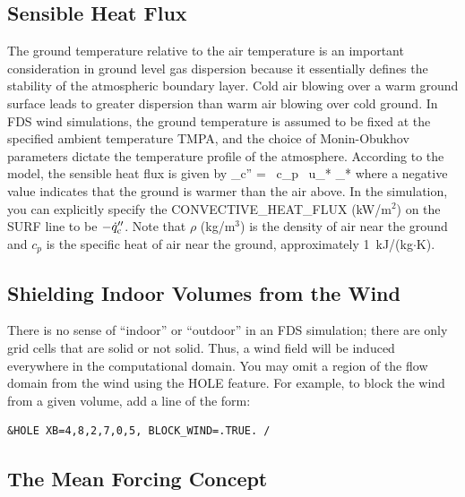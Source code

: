 \documentclass[11pt]{book}
\begin{document}
\subsection{Sensible Heat Flux}

The ground temperature relative to the air temperature is an important consideration in ground level gas dispersion because it essentially defines the stability of the atmospheric boundary layer. Cold air blowing over a warm ground surface leads to greater dispersion than warm air blowing over cold ground. In FDS wind simulations, the ground temperature is assumed to be fixed at the specified ambient temperature {\ct TMPA}, and the choice of Monin-Obukhov parameters dictate the temperature profile of the atmosphere.  According to the model, the sensible heat flux is given by
\be
   _{\rm c}'' = \rho \, c_p \, u_* \theta_*
\ee
where a negative value indicates that the ground is warmer than the air above. In the simulation, you can explicitly specify the {\ct CONVECTIVE\_HEAT\_FLUX} (kW/m$^2$) on the {\ct SURF} line to be $-\dot{q}_{\rm c}''$. Note that $\rho$ (kg/m$^3$) is the density of air near the ground and $c_p$ is the specific heat of air near the ground, approximately 1~kJ/(kg$\cdot$K).

\subsection{Shielding Indoor Volumes from the Wind}
\label{info:BLOCK_WIND}

There is no sense of ``indoor'' or ``outdoor'' in an FDS simulation; there are only grid cells that are solid or not solid. Thus, a wind field will be induced everywhere in the computational domain. You may omit a region of the flow domain from the wind using the {\ct HOLE} feature. For example, to block the wind from a given volume, add a line of the form:
\begin{lstlisting}
&HOLE XB=4,8,2,7,0,5, BLOCK_WIND=.TRUE. /
\end{lstlisting}

\subsection{The Mean Forcing Concept}
\label{info:SPONGE_CELLS}
\end{document}
